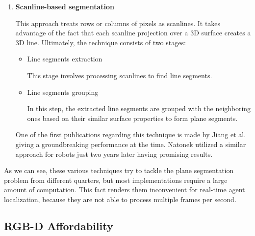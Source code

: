 \begin{enumerate}
\item \textbf{Scanline-based segmentation}

This approach treats rows or columns of pixels as scanlines.
It takes advantage of the fact that each scanline projection over a 3D surface creates a 3D line.
Ultimately, the technique consists of two stages:

\begin{itemize}

\item Line segments extraction

This stage involves processing scanlines to find line segments.

\item Line segments grouping

In this step, the extracted line segments are grouped with the neighboring ones based on their similar surface properties
to form plane segments.

\end{itemize}

One of the first publications regarding this technique is made by
Jiang et al. \cite{JiangOneOfTheFirstScanlineStrategies} giving a groundbreaking performance at the time.
Natonek \cite{inproceedingsNatonekScanlinesForRobots} utilized a similar approach for robots
just two years later having promising results.

\end{enumerate}

As we can see, these various techniques try to tackle the plane segmentation problem from different quarters,
but most implementations require a large amount of computation.
This fact renders them inconvenient for real-time agent localization,
because they are not able to process multiple frames per second.

\subsection{RGB-D Affordability}

